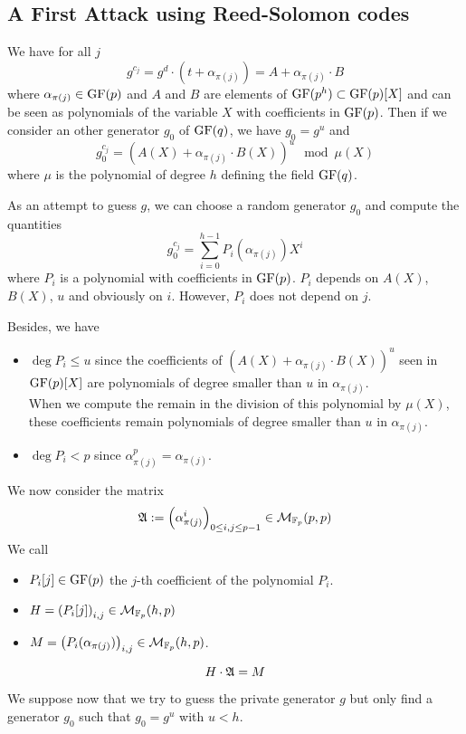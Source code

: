 \documentclass[12pt,a4paper,titlepage]{article}
\begin{document}
\subsection{A First Attack using Reed-Solomon codes}

We have for all $j$
$$ g^{c_j} = g^d \cdot (t + \alpha_{\pi(j)} ) = A + \alpha_{\pi(j)} \cdot B $$
where $\alpha_{\pi(j)} \in \text{GF}(p)$ and $A$ and $B$ are elements of $\text{GF}(p^h) \subset \text{GF}(p)[X]$ and can be seen as polynomials of the variable $X$ with coefficients in $\text{GF}(p)$.
Then if we consider an other generator $g_0$ of $\GF(q)^{\*}$, we have $g_0 = g^u$ and
$$ g_0 ^{c_j} = \left( A(X) + \alpha_{\pi(j)} \cdot B(X) \right)^u \mod \mu(X) $$
where $\mu$ is the polynomial of degree $h$ defining the field $\text{GF}(q)$.

As an attempt to guess $g$, we can choose a random generator $g_0$ and compute the quantities
$$ g_0 ^{c_j} = \sum_{i=0}^{h-1} P_i(\alpha_{\pi(j)}) X^i $$
where $P_i$ is a polynomial with coefficients in $\text{GF}(p)$. $P_i$ depends on $A(X)$, $B(X)$, $u$ and obviously on $i$. However, $P_i$ does not depend on $j$.

Besides, we have
\begin{itemize}
\item $\deg P_i \leq u$ since the coefficients of $\left( A(X) + \alpha_{\pi(j)} \cdot B(X) \right)^u$ seen in $\text{GF}(p)[X]$ are polynomials of degree smaller than $u$ in $\alpha_{\pi(j)}$.\\
When we compute the remain in the division of this polynomial by $\mu(X)$, these coefficients remain polynomials of degree smaller than $u$ in $\alpha_{\pi(j)}$.
\item $\deg P_i < p$ since $\alpha_{\pi(j)}^p = \alpha_{\pi(j)}$.
\end{itemize}

We now consider the matrix
$$ \frak{A} := \left( \alpha_{\pi(j)}^i \right)_{0 \leq i,j \leq p-1} \in \mathcal{M}_{\mathbb{F}_p}(p,p)$$
We call
\begin{itemize}
\item $P_i[j] \in \text{GF}(p)$ the $j$-th coefficient of the polynomial $P_i$.
\item $H = \left( P_i[j] \right)_{i,j} \in \mathcal{M}_{\mathbb{F}_p}(h,p)$
\item $M = \left( P_i(\alpha_{\pi(j)}) \right)_{i,j} \in \mathcal{M}_{\mathbb{F}_p}(h,p)$.
\end{itemize}

$$ H \cdot \frak{A} = M $$

We suppose now that we try to guess the private generator $g$ but only find a generator $g_0$ such that $g_0 = g^u$ with $u < h$.
\end{document}
